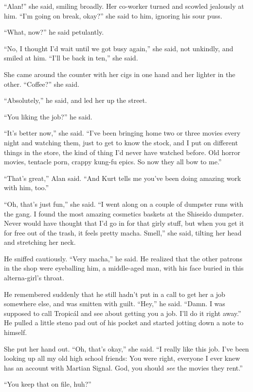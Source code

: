 \documentclass{article}
\begin{document}
``Alan!'' she said, smiling broadly.  Her co-worker turned and scowled
jealously at him.  ``I'm going on break, okay?'' she said to him,
ignoring his sour puss.

``What, now?'' he said petulantly.

``No, I thought I'd wait until we got busy again,'' she said, not
unkindly, and smiled at him.  ``I'll be back in ten,'' she said.

She came around the counter with her cigs in one hand and her lighter
in the other.  ``Coffee?'' she said.

``Absolutely,'' he said, and led her up the street.

``You liking the job?'' he said.

``It's better now,'' she said.  ``I've been bringing home two or three
movies every night and watching them, just to get to know the stock,
and I put on different things in the store, the kind of thing I'd
never have watched before.  Old horror movies, tentacle porn, crappy
kung-fu epics.  So now they all bow to me.''

``That's great,'' Alan said.  ``And Kurt tells me you've been doing
amazing work with him, too.''

``Oh, that's just fun,'' she said.  ``I went along on a couple of
dumpster runs with the gang.  I found the most amazing cosmetics
baskets at the Shiseido dumpster.  Never would have thought that I'd
go in for that girly stuff, but when you get it for free out of the
trash, it feels pretty macha.  Smell,'' she said, tilting her head and
stretching her neck.

He sniffed cautiously.  ``Very macha,'' he said.  He realized that the
other patrons in the shop were eyeballing him, a middle-aged man, with
his face buried in this alterna-girl's throat.

He remembered suddenly that he still hadn't put in a call to get her a
job somewhere else, and was smitten with guilt.  ``Hey,'' he said. 
``Damn.  I was supposed to call Tropic\'{a}l and see about getting you
a job.  I'll do it right away.'' He pulled a little steno pad out of
his pocket and started jotting down a note to himself.

She put her hand out.  ``Oh, that's okay,'' she said.  ``I really like
this job.  I've been looking up all my old high school friends:  You
were right, everyone I ever knew has an account with Martian Signal. 
God, you should \textit{see} the movies they rent.''

``You keep that on file, huh?''
\end{document}

